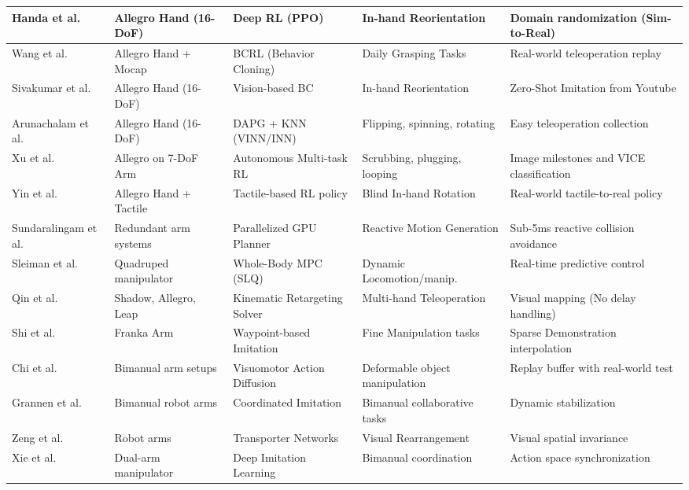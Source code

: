 \documentclass[letterpaper,journal]{IEEEtran}
\begin{document}
\begin{table}[t]
\begin{tabular}{|l|l|l|l|p{4cm}|}
Handa et al. \cite{dextreme} & Allegro Hand (16-DoF) & Deep RL (PPO) & In-hand Reorientation & Domain randomization (Sim-to-Real) \\ \hline
Wang et al. \cite{dexcap} & Allegro Hand + Mocap & BCRL (Behavior Cloning) & Daily Grasping Tasks & Real-world teleoperation replay \\ \hline
Sivakumar et al. \cite{robotickinesis} & Allegro Hand (16-DoF) & Vision-based BC & In-hand Reorientation & Zero-Shot Imitation from Youtube \\ \hline
Arunachalam et al. \cite{dime} & Allegro Hand (16-DoF) & DAPG + KNN (VINN/INN) & Flipping, spinning, rotating & Easy teleoperation collection \\ \hline
Xu et al. \cite{avail} & Allegro on 7-DoF Arm & Autonomous Multi-task RL & Scrubbing, plugging, looping & Image milestones and VICE classification \\ \hline
Yin et al. \cite{rotating_touch} & Allegro Hand + Tactile & Tactile-based RL policy & Blind In-hand Rotation & Real-world tactile-to-real policy \\ \hline
Sundaralingam et al. \cite{curobo} & Redundant arm systems & Parallelized GPU Planner & Reactive Motion Generation & Sub-5ms reactive collision avoidance \\ \hline
Sleiman et al. \cite{wholbody_mpc} & Quadruped manipulator & Whole-Body MPC (SLQ) & Dynamic Locomotion/manip. & Real-time predictive control \\ \hline
Qin et al. \cite{anyteleop} & Shadow, Allegro, Leap & Kinematic Retargeting Solver & Multi-hand Teleoperation & Visual mapping (No delay handling) \\ \hline
Shi et al. \cite{waypoint_il} & Franka Arm & Waypoint-based Imitation & Fine Manipulation tasks & Sparse Demonstration interpolation \\ \hline
Chi et al. \cite{diffusionpolicy} & Bimanual arm setups & Visuomotor Action Diffusion & Deformable object manipulation & Replay buffer with real-world test \\ \hline
Grannen et al. \cite{stabilizetoact} & Bimanual robot arms & Coordinated Imitation & Bimanual collaborative tasks & Dynamic stabilization \\ \hline
Zeng et al. \cite{transporter_net} & Robot arms & Transporter Networks & Visual Rearrangement & Visual spatial invariance \\ \hline
Xie et al. \cite{bimanual_manipulation} & Dual-arm manipulator & Deep Imitation Learning & Bimanual coordination & Action space synchronization \\ \hline

\end{tabular}
\end{table}
\end{document}
